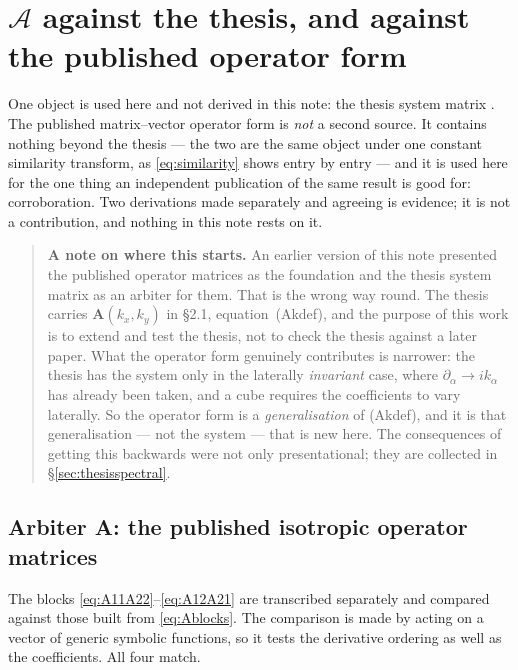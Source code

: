 \documentclass[11pt,a4paper]{article}
\newcommand{\bA}{\mathbf{A}}
\newcommand{\Aop}{\mathcal{A}}
\begin{document}
\section{\texorpdfstring{$\Aop$}{A} against the thesis, and against the
published operator form}\label{sec:against}

One object is used here and not derived in this note: the thesis system matrix
\cite{nestor1996}.  The published matrix--vector operator form \cite{mvwe} is
\emph{not} a second source.  It contains nothing beyond the thesis --- the two
are the same object under one constant similarity transform, as
\eqref{eq:similarity} shows entry by entry --- and it is used here for the one
thing an independent publication of the same result is good for: corroboration.
Two derivations made separately and agreeing is evidence; it is not a
contribution, and nothing in this note rests on it.

\begin{quote}
\textbf{A note on where this starts.}  An earlier version of this note presented
the published operator matrices as the foundation and the thesis system matrix
as an arbiter for them.  That is the wrong way round.  The thesis carries
$\bA(k_x,k_y)$ in \S2.1, equation~(Akdef), and the purpose of this work is to
extend and test the thesis, not to check the thesis against a later paper.  What
the operator form genuinely contributes is narrower: the thesis has the system
only in the laterally \emph{invariant} case, where $\partial_\alpha \to ik_\alpha$
has already been taken, and a cube requires the coefficients to vary laterally.
So the operator form is a \emph{generalisation} of (Akdef), and it is
that generalisation --- not the system --- that is new here.  The consequences
of getting this backwards were not only presentational; they are collected in
\S\ref{sec:thesisspectral}.
\end{quote}

\subsection{Arbiter A: the published isotropic operator matrices}\label{sec:arbiterA}

The blocks \eqref{eq:A11A22}--\eqref{eq:A12A21} are transcribed separately and
compared against those built from \eqref{eq:Ablocks}.  The comparison is made by
acting on a vector of generic symbolic functions, so it tests the derivative
ordering as well as the coefficients.  All four match.
\end{document}
